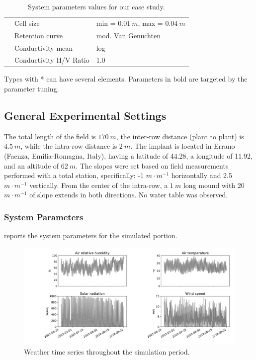\begin{table}[H]
\begin{tabular}{p{1.2cm}p{5cm}p{7.5cm}}
		& Cell size  &  min = $0.01~m$, max = $0.04~m$  \\
		& Retention curve & mod. Van Genuchten\\ 
	    & Conductivity mean &  log \\
		& Conductivity H/V Ratio  &  1.0 \\
		\bottomrule
	\end{tabular}%
	\begin{tablenotes}
      \scriptsize
      \item Types with * can have several elements. Parameters in bold are targeted by the parameter tuning.
    \end{tablenotes}
        \caption{System parameters values for our case study.}

	\label{tab:parameter_instances}%
\end{table}%

\subsection{General Experimental Settings}
\label{orchard-ssec:settings}

The total length of the field is $170~m$, the inter-row distance (plant to plant) is $4.5~m$, while the intra-row distance is $2~m$.
The implant is located in Errano (Faenza, Emilia-Romagna, Italy), having a latitude of 44.28, a longitude of 11.92, and an altitude of $62~m$.
The slopes were set based on field measurements performed with a total station, specifically: -1 $m \cdot m^{-1}$ horizontally and 2.5 $m \cdot m^{-1}$ vertically.
From the center of the intra-row, a $1~m$ long mound with 20 $m \cdot m^{-1}$ of slope extends in both directions.
No water table was observed.

\subsubsection{System Parameters}

 reports the system parameters for the simulated portion.

\begin{figure}[t]
    \centering
    \includegraphics[scale=.45]{chapters/physics-aware/orchard/img/meteo.pdf}
    \caption{Weather time series throughout the simulation period.}
    \label{orchard-fig:meteo}
\end{figure}

